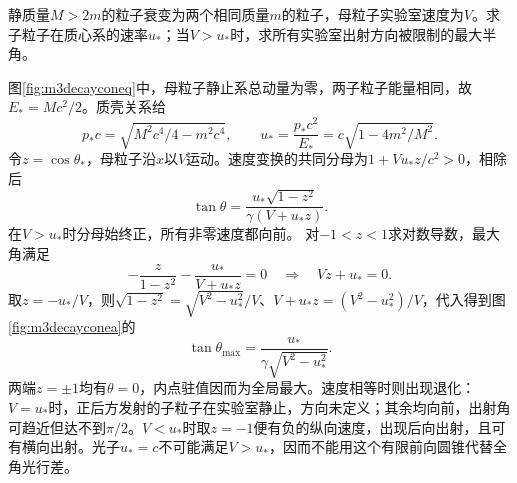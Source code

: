 \begin{exercise}\label{ex:m3decaycone}
静质量$M>2m$的粒子衰变为两个相同质量$m$的粒子，母粒子实验室速度为$V$。求子粒子在质心系的速率$u_*$；当$V>u_*$时，求所有实验室出射方向被限制的最大半角。
\end{exercise}
\begin{solution}
图\ref{fig:m3decayconeq}中，母粒子静止系总动量为零，两子粒子能量相同，故$E_*=Mc^2/2$。质壳关系给
\[
 p_*c=\sqrt{M^2c^4/4-m^2c^4},\qquad
 u_*=\frac{p_*c^2}{E_*}=c\sqrt{1-4m^2/M^2}.
\]
令$z=\cos\theta_*$，母粒子沿$x$以$V$运动。速度变换的共同分母为$1+Vu_*z/c^2>0$，相除后
\[
 \tan\theta=\frac{u_*\sqrt{1-z^2}}{\gamma(V+u_*z)}.
\]
在$V>u_*$时分母始终正，所有非零速度都向前。
对$-1<z<1$求对数导数，最大角满足
\[
 -\frac z{1-z^2}-\frac{u_*}{V+u_*z}=0
 \quad\Longrightarrow\quad Vz+u_*=0.
\]
取$z=-u_*/V$，则$\sqrt{1-z^2}=\sqrt{V^2-u_*^2}/V$、$V+u_*z=(V^2-u_*^2)/V$，代入得到图\ref{fig:m3decayconea}的
\[
 \tan\theta_{\max}=\frac{u_*}{\gamma\sqrt{V^2-u_*^2}}.
\]
两端$z=\pm1$均有$\theta=0$，内点驻值因而为全局最大。速度相等时则出现退化：$V=u_*$时，正后方发射的子粒子在实验室静止，方向未定义；其余均向前，出射角可趋近但达不到$\pi/2$。$V<u_*$时取$z=-1$便有负的纵向速度，出现后向出射，且可有横向出射。光子$u_*=c$不可能满足$V>u_*$，因而不能用这个有限前向圆锥代替全角光行差。
\end{solution}
